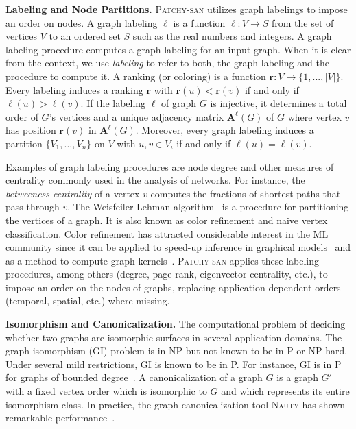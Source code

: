 \documentclass{article}
\newcommand{\patchysan}{{\textsc{Patchy-san}}\xspace}
\newcommand{\nauty}{{\textsc{Nauty}}\xspace}
\begin{document}
\textbf{Labeling and Node Partitions.}
\textsc{Patchy-san} utilizes graph labelings to impose an order on nodes. 
A graph labeling $\ell$ is a function $\ell: V \rightarrow S$  from the set of vertices $V$ to an ordered set $S$ such as the real numbers and integers. A graph labeling procedure computes a graph labeling for an input graph. When it is clear from the context, we use \emph{labeling} to refer to both, the graph labeling and the  procedure to compute it.  A ranking (or coloring) is a function $\mathbf{r}:V \rightarrow \{1, ..., |V|\}$. Every labeling induces a ranking $\mathbf{r}$ with $\mathbf{r}(u) < \mathbf{r}(v)$ if and only if $\ell(u)>\ell(v)$. If the labeling $\ell$ of graph $G$ is injective, it determines a total order of $G$'s vertices and a unique adjacency matrix $\mathbf{A}^{\ell}(G)$ of $G$ where vertex $v$ has position $\mathbf{r}(v)$ in $\mathbf{A}^{\ell}(G)$. Moreover, every graph labeling induces a partition $\{V_1, ..., V_n\}$ on $V$  with $u, v \in V_i$ if and only if $\ell(u)=\ell(v)$. 

Examples of graph labeling procedures are node degree and other measures of centrality commonly used in the analysis of networks. For instance, the \emph{betweeness centrality} of a vertex $v$ computes the fractions of shortest paths that pass through $v$. The Weisfeiler-Lehman algorithm~\cite{weisfeiler:1968,douglas2011weisfeiler} is a procedure for partitioning the vertices of a graph. It is also known as color refinement and naive vertex classification. Color refinement has attracted considerable interest in the ML community since it can be applied to speed-up inference in graphical models~\cite{Kersting:2009,Kersting:2014} and as a method to compute graph kernels~\cite{Shervashidze:2011}. \patchysan applies these labeling procedures, among others (degree, page-rank, eigenvector centrality, etc.), to impose an order on the nodes of graphs, replacing application-dependent orders (temporal, spatial, etc.) where missing.

\textbf{Isomorphism and Canonicalization.}
The computational problem of deciding whether two graphs are isomorphic surfaces in several application domains. The graph isomorphism (GI) problem is in NP but not known to be in P or NP-hard. Under several mild restrictions, GI is known to be in P. For instance, GI is in P for graphs of bounded degree~\cite{luks:1982}. A canonicalization of a graph $G$ is a graph $G'$ with a fixed vertex order which is isomorphic to $G$ and which represents its entire isomorphism class. In practice, the graph canonicalization tool \nauty has shown remarkable performance~\cite{McKay:2014}.
\end{document}
